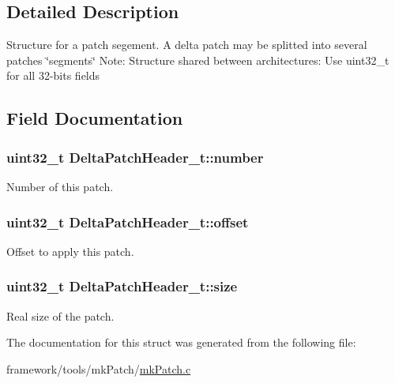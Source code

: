 \subsection{Detailed Description}
Structure for a patch segement. A delta patch may be splitted into several patches \char`\"{}segments\char`\"{} Note\+: Structure shared between architectures\+: Use uint32\+\_\+t for all 32-\/bits fields 

\subsection{Field Documentation}
\subsubsection[{\texorpdfstring{number}{number}}]{\setlength{\rightskip}{0pt plus 5cm}uint32\+\_\+t Delta\+Patch\+Header\+\_\+t\+::number}\hypertarget{struct_delta_patch_header__t_a319448628ece38bf1e42ae8108a07940}{}\label{struct_delta_patch_header__t_a319448628ece38bf1e42ae8108a07940}


Number of this patch. 

\subsubsection[{\texorpdfstring{offset}{offset}}]{\setlength{\rightskip}{0pt plus 5cm}uint32\+\_\+t Delta\+Patch\+Header\+\_\+t\+::offset}\hypertarget{struct_delta_patch_header__t_a1b849ba3b3d9f5679dd58d04d12dd0b5}{}\label{struct_delta_patch_header__t_a1b849ba3b3d9f5679dd58d04d12dd0b5}


Offset to apply this patch. 

\subsubsection[{\texorpdfstring{size}{size}}]{\setlength{\rightskip}{0pt plus 5cm}uint32\+\_\+t Delta\+Patch\+Header\+\_\+t\+::size}\hypertarget{struct_delta_patch_header__t_a38cb9583260e028d72ee55ab92bc8860}{}\label{struct_delta_patch_header__t_a38cb9583260e028d72ee55ab92bc8860}


Real size of the patch. 



The documentation for this struct was generated from the following file\+:\begin{DoxyCompactItemize}
\item 
framework/tools/mk\+Patch/\hyperlink{mk_patch_8c}{mk\+Patch.\+c}\end{DoxyCompactItemize}
